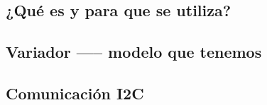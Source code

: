 \subsection{¿Qué es y para que se utiliza?}
\subsection{Variador ----- modelo que tenemos}
\subsection{Comunicación I2C}
\newpage